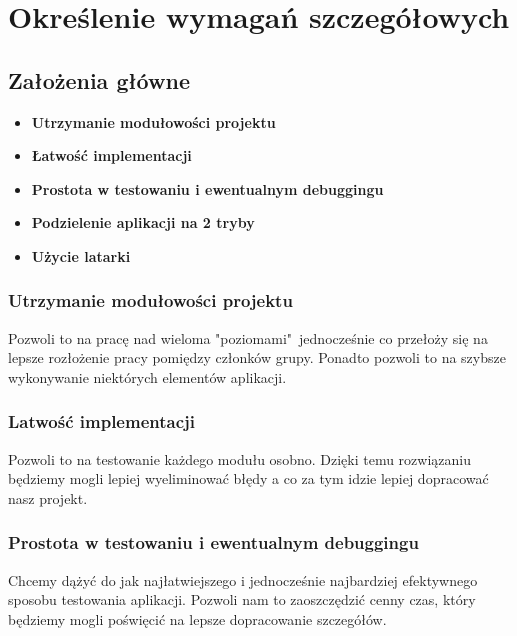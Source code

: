 \newpage
\section{Określenie wymagań szczegółowych}		%
\subsection{Założenia główne}
\begin{itemize}
\item \textbf{Utrzymanie modułowości projektu }
\item \textbf{Łatwość implementacji } 
\item \textbf{Prostota w testowaniu i ewentualnym debuggingu}
\item \textbf{Podzielenie aplikacji na 2 tryby}
\item\textbf{ Użycie latarki}
\end{itemize}

\subsubsection{Utrzymanie modułowości projektu}
Pozwoli to na pracę nad wieloma "poziomami"~jednocześnie co przełoży się na lepsze rozłożenie pracy pomiędzy członków grupy. Ponadto pozwoli to na szybsze wykonywanie niektórych elementów aplikacji.

\subsubsection{Latwość implementacji}
Pozwoli to na testowanie każdego modułu osobno. Dzięki temu rozwiązaniu będziemy mogli lepiej wyeliminować błędy a co za tym idzie lepiej dopracować nasz projekt.

\subsubsection{Prostota w testowaniu i ewentualnym debuggingu}
Chcemy dążyć do jak najłatwiejszego i jednocześnie najbardziej efektywnego sposobu testowania aplikacji. Pozwoli nam to zaoszczędzić cenny czas, który będziemy mogli poświęcić na lepsze dopracowanie szczegółów.

